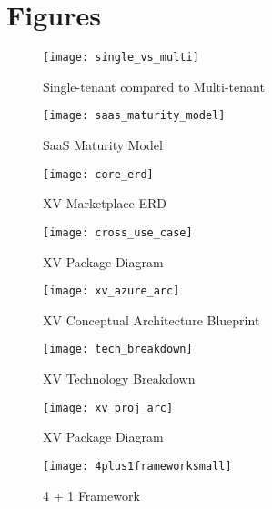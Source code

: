 \chapter{Figures}
\label{appendix:figures}


\begin{figure}
\centering
\texttt{[image: single\_vs\_multi]}
\caption{Single-tenant compared to Multi-tenant}
\label{fig:multi-vs-single}
\end{figure}


\begin{figure}
\centering
\texttt{[image: saas\_maturity\_model]}
\caption{SaaS Maturity Model}
\label{fig:saas_maturity_model}
\end{figure}


\begin{figure}
\centering
\texttt{[image: core\_erd]}
\caption{XV Marketplace ERD}
\label{fig:xv_erd}
\end{figure}


\begin{figure}
\centering
\texttt{[image: cross\_use\_case]}
\caption{XV Package Diagram}
\label{fig:cross_use_case}
\end{figure}


\begin{figure}
\centering
\texttt{[image: xv\_azure\_arc]}
\caption{XV Conceptual Architecture Blueprint}
\label{fig:xv_azure_arc}
\end{figure}

\begin{figure}
\centering
\texttt{[image: tech\_breakdown]}
\caption{XV Technology Breakdown}
\label{fig:tech_breakdown}
\end{figure}

\begin{figure}
\centering
\texttt{[image: xv\_proj\_arc]}
\caption{XV Package Diagram}
\label{fig:xv_proj_arc}
\end{figure}

\begin{figure}
\centering
\texttt{[image: 4plus1frameworksmall]}
\caption{4 + 1 Framework}
\label{fig:4plus1frameworksmall}
\end{figure}


